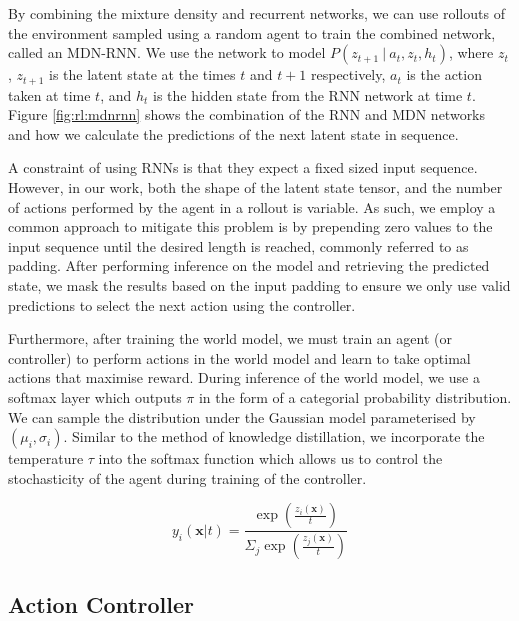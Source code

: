 By combining the mixture density and recurrent networks, we can use rollouts of the environment sampled using a random agent to train the combined network, called an MDN-RNN. We use the network to model $P(z_{t+1}~|~a_t, z_t, h_t)$, where $z_t$, $z_{t+1}$ is the latent state at the times $t$ and $t+1$ respectively, $a_t$ is the action taken at time $t$, and $h_t$ is the hidden state from the RNN network at time $t$. Figure \ref{fig:rl:mdnrnn} shows the combination of the RNN and MDN networks and how we calculate the predictions of the next latent state in sequence.

A constraint of using RNNs is that they expect a fixed sized input sequence. However, in our work, both the shape of the latent state tensor, and the number of actions performed by the agent in a rollout is variable. As such, we employ a common approach to mitigate this problem is by prepending zero values to the input sequence until the desired length is reached, commonly referred to as padding. After performing inference on the model and retrieving the predicted state, we mask the results based on the input padding to ensure we only use valid predictions to select the next action using the controller.

Furthermore, after training the world model, we must train an agent (or controller) to perform actions in the world model and learn to take optimal actions that maximise reward. During inference of the world model, we use a softmax layer which outputs $\pi$ in the form of a categorial probability distribution. We can sample the distribution under the Gaussian model parameterised by $(\mu_i, \sigma_i)$. Similar to the method of knowledge distillation, we incorporate the temperature $\tau$ into the softmax function which allows us to control the stochasticity of the agent during training of the controller.

$$
y_i(\mathbf{x}|t) = \frac{\exp\left( \frac{z_i(\mathbf{x})}{t} \right) }{\Sigma_j \exp \left( \frac{z_j(\mathbf{x})}{t} \right) }
$$

\subsection{Action Controller}